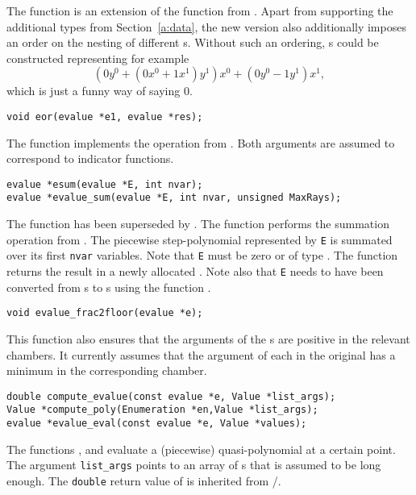 The function  is an extension of the function
 from .
Apart from supporting the additional types from Section~\ref{a:data},
the new version also additionally imposes an order on the nesting of
different s.
Without such an ordering, s could be constructed
representing for example
$$
(0 y^ 0 + ( 0 x^0 + 1 x^1 ) y^1 ) x^0 + (0 y^0 - 1 y^1) x^1
,
$$
which is just a funny way of saying $0$.

\begin{verbatim}
void eor(evalue *e1, evalue *res);
\end{verbatim}
The function  implements the 
operation from .  Both arguments
are assumed to correspond to indicator functions.

\begin{verbatim}
evalue *esum(evalue *E, int nvar);
evalue *evalue_sum(evalue *E, int nvar, unsigned MaxRays);
\end{verbatim}
The function  has been superseded by
.
The function  performs the summation
operation from .
The piecewise step-polynomial represented by \verb+E+ is summated
over its first \verb+nvar+ variables.
Note that \verb+E+ must be zero or of type .
The function returns the result in a newly allocated 
.
Note also that \verb+E+ needs to have been converted
from s to s using
the function .
\begin{verbatim}
void evalue_frac2floor(evalue *e);
\end{verbatim}
This function also ensures that the arguments of the
s are positive in the relevant chambers.
It currently assumes that the argument of each
 in the original 
has a minimum in the corresponding chamber.

\begin{verbatim}
double compute_evalue(const evalue *e, Value *list_args);
Value *compute_poly(Enumeration *en,Value *list_args);
evalue *evalue_eval(const evalue *e, Value *values);
\end{verbatim}
The functions ,
 and
evaluate a (piecewise) quasi-polynomial
at a certain point.  The argument \verb+list_args+
points to an array of s that is assumed
to be long enough.
The \verb+double+ return value of 
is inherited from \PolyLib/.

